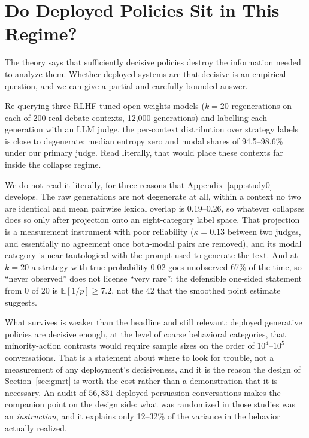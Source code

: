 \documentclass[11pt]{article}
\theoremstyle{definition}
\theoremstyle{remark}
\newcommand{\E}{\mathbb{E}}
\begin{document}
\section{Do Deployed Policies Sit in This Regime?}\label{sec:study0}

The theory says that sufficiently decisive policies destroy the information
needed to analyze them. Whether deployed systems are that decisive is an
empirical question, and we can give a partial and carefully bounded answer.

Re-querying three RLHF-tuned open-weights models ($k = 20$ regenerations on
each of 200 real debate contexts, 12{,}000 generations) and labelling each
generation with an LLM judge, the per-context distribution over strategy
labels is close to degenerate: median entropy zero and modal shares of
94.5--98.6\% under our primary judge. Read literally, that would place these
contexts far inside the collapse regime.

We do not read it literally, for three reasons that Appendix~\ref{app:study0}
develops. The raw generations are not degenerate at all, within a context
no two are identical and mean pairwise lexical overlap is 0.19--0.26, so
whatever collapses does so only after projection onto an eight-category label
space. That projection is a measurement instrument with poor reliability
($\kappa = 0.13$ between two judges, and essentially no agreement once
both-modal pairs are removed), and its modal category is near-tautological
with the prompt used to generate the text. And at $k = 20$ a strategy with
true probability $0.02$ goes unobserved 67\% of the time, so ``never
observed'' does not license ``very rare'': the defensible one-sided statement
from $0$ of $20$ is $\E[1/p] \geq 7.2$, not the $42$ that the smoothed
point estimate suggests.

What survives is weaker than the headline and still relevant: deployed
generative policies are decisive enough, at the level of coarse behavioral
categories, that minority-action contrasts would require sample sizes on the
order of $10^{4}$--$10^{5}$ conversations. That is a statement about where to
look for trouble, not a measurement of any deployment's decisiveness, and it
is the reason the design of Section~\ref{sec:gmrt} is worth the cost rather
than a demonstration that it is necessary. An audit of $56{,}831$ deployed
persuasion conversations makes the companion point on the design side: what
was randomized in those studies was an \emph{instruction}, and it explains
only 12--32\% of the variance in the behavior actually realized.
\end{document}
